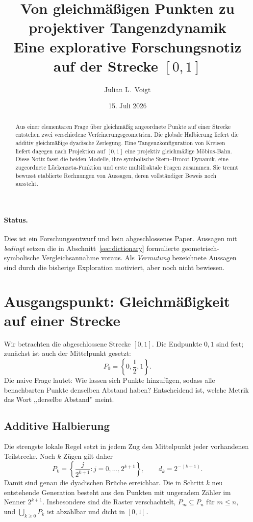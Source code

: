\documentclass[11pt,a4paper]{article}
\title{Von gleichmäßigen Punkten zu projektiver Tangenzdynamik\\
\large Eine explorative Forschungsnotiz auf der Strecke $[0,1]$}
\author{Julian L.\ Voigt}
\date{15. Juli 2026}
\begin{document}
\maketitle

\begin{abstract}
Aus einer elementaren Frage über gleichmäßig angeordnete Punkte auf einer
Strecke entstehen zwei verschiedene Verfeinerungsgeometrien. Die globale
Halbierung liefert die additiv gleichmäßige dyadische Zerlegung. Eine
Tangenzkonfiguration von Kreisen liefert dagegen nach Projektion auf
$[0,1]$ eine projektiv gleichmäßige Möbius-Bahn. Diese Notiz fasst die
beiden Modelle, ihre symbolische Stern--Brocot-Dynamik, eine zugeordnete
Lückenzeta-Funktion und erste multifraktale Fragen zusammen. Sie trennt
bewusst etablierte Rechnungen von Aussagen, deren vollständiger Beweis noch
aussteht.
\end{abstract}

\paragraph{Status.}
Dies ist ein Forschungsentwurf und kein abgeschlossenes Paper. Aussagen mit
\emph{bedingt} setzen die in Abschnitt~\ref{sec:dictionary} formulierte
geometrisch-symbolische Vergleichsannahme voraus. Als \emph{Vermutung}
bezeichnete Aussagen sind durch die bisherige Exploration motiviert, aber
noch nicht bewiesen.

\section{Ausgangspunkt: Gleichmäßigkeit auf einer Strecke}

Wir betrachten die abgeschlossene Strecke $[0,1]$. Die Endpunkte $0,1$ sind
fest; zunächst ist auch der Mittelpunkt gesetzt:
\[
  P_0=\left\{0,\frac12,1\right\}.
\]
Die naive Frage lautet: Wie lassen sich Punkte hinzufügen, sodass alle
benachbarten Punkte denselben Abstand haben? Entscheidend ist, welche Metrik
das Wort ,,derselbe Abstand'' meint.

\subsection{Additive Halbierung}

Die strengste lokale Regel setzt in jedem Zug den Mittelpunkt jeder
vorhandenen Teilstrecke. Nach $k$ Zügen gilt daher
\[
 P_k=\left\{\frac{j}{2^{k+1}}:j=0,\ldots,2^{k+1}\right\},
 \qquad d_k=2^{-(k+1)}.
\]
Damit sind genau die dyadischen Brüche erreichbar. Die in Schritt $k$ neu
entstehende Generation besteht aus den Punkten mit ungeradem Zähler im
Nenner $2^{k+1}$. Insbesondere sind die Raster verschachtelt,
$P_m\subseteq P_n$ für $m\le n$, und $\bigcup_{k\ge0}P_k$ ist abzählbar
und dicht in $[0,1]$.
\end{document}
